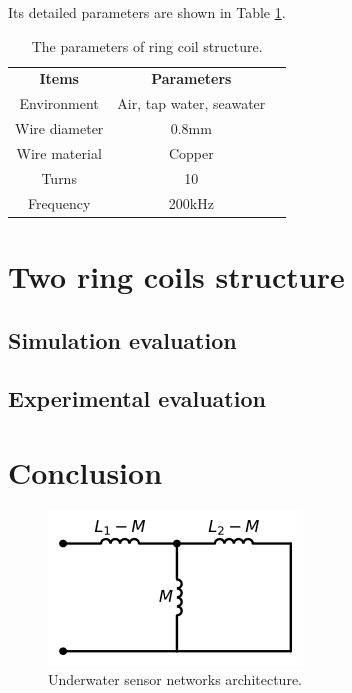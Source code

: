Its detailed parameters are shown in Table \ref{table:ring coil parameters}.

\begin{table}[htbp]
    \centering
    \caption{The parameters of ring coil structure.}
    \begin{tabular}{ c|cc }
        \thickhline
        \textbf{Items} & \textbf{Parameters}     \\
        \thickhline
        Environment    & Air, tap water, seawater \\ \hline
        Wire diameter  & 0.8mm                    \\ \hline
        Wire material  & Copper                   \\ \hline
        Turns          & 10                       \\ \hline
        Frequency      & 200kHz                   \\ \hline
    \end{tabular}
    \label{table:ring coil parameters}
\end{table}


\section{Two ring coils structure}
\subsection{Simulation evaluation}
\subsection{Experimental evaluation}

\section{Conclusion}

\begin{figure}[htbp]
    \centering
    \includegraphics[width=0.4\linewidth]{images/3_mutual_inductance.png}
    \caption{Underwater sensor networks architecture.}
    \label{fig:3_mutual_inductance}
\end{figure}

